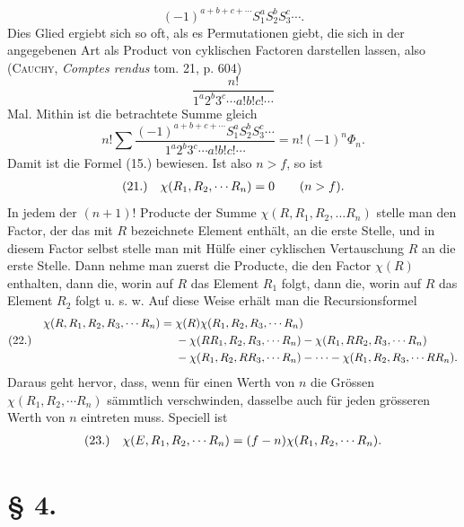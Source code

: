\documentclass[11pt]{article}
\makeatletter
\newcommand{\frobtag}[2]{\[\begin{array}{@{}r@{\quad}l@{}}\textup{(#1)} & \displaystyle #2\end{array}\]}
\newcommand{\frobtagc}[2]{\[\begin{array}{@{}r@{\quad}c@{}}\textup{(#1)} & \displaystyle #2\end{array}\]}
\makeatother
\begin{document}
\[
(-1)^{a+b+c+\cdots}S_1^aS_2^bS_3^c\cdots .
\]
Dies Glied ergiebt sich so oft, als es Permutationen giebt, die sich in der angegebenen Art als Product von cyklischen Factoren darstellen lassen, also (\textsc{Cauchy}, \emph{Comptes rendus} tom. 21, p. 604)
\[
\frac{n!}{1^a2^b3^c\cdots a!b!c!\cdots}
\]
Mal. Mithin ist die betrachtete Summe gleich
\[
n!\sum\frac{(-1)^{a+b+c+\cdots}S_1^aS_2^bS_3^c\cdots}{1^a2^b3^c\cdots a!b!c!\cdots}=n!(-1)^n\Phi_n.
\]
Damit ist die Formel (15.) bewiesen. Ist also $n>f$, so ist
\frobtagc{21.}{\chi(R_1,R_2,\cdots R_n)=0\qquad(n>f).}
In jedem der $(n+1)!$ Producte der Summe $\chi(R,R_1,R_2,\ldots R_n)$ stelle man den Factor, der das mit $R$ bezeichnete Element enthält, an die erste Stelle, und in diesem Factor selbst stelle man mit Hülfe einer cyklischen Vertauschung $R$ an die erste Stelle. Dann nehme man zuerst die Producte, die den Factor $\chi(R)$ enthalten, dann die, worin auf $R$ das Element $R_1$ folgt, dann die, worin auf $R$ das Element $R_2$ folgt u. s. w. Auf diese Weise erhält man die Recursionsformel
\frobtag{22.}{\begin{aligned}
\chi(R,R_1,R_2,R_3,\cdots R_n)={}&\chi(R)\chi(R_1,R_2,R_3,\cdots R_n)\nobreak\\
&{}-\chi(RR_1,R_2,R_3,\cdots R_n)-\chi(R_1,RR_2,R_3,\cdots R_n)\nobreak\\
&{}-\chi(R_1,R_2,RR_3,\cdots R_n)-\cdots-\chi(R_1,R_2,R_3,\cdots RR_n).
\end{aligned}}
Daraus geht hervor, dass, wenn für einen Werth von $n$ die Grössen $\chi(R_1,R_2,\cdots R_n)$ sämmtlich verschwinden, dasselbe auch für jeden grösseren Werth von $n$ eintreten muss. Speciell ist
\frobtagc{23.}{\chi(E,R_1,R_2,\cdots R_n)=(f-n)\chi(R_1,R_2,\cdots R_n).}

\section*{§ 4.}
\end{document}
